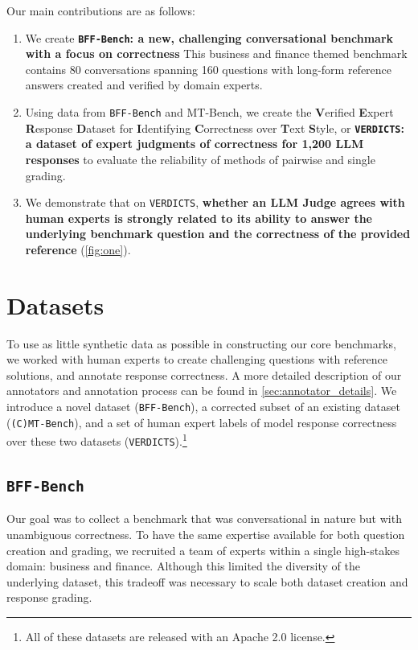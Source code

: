 \documentclass{article}
\newcommand{\judgebenchmark}{\texttt{VERDICTS}}
\newcommand{\evalbenchmark}{\texttt{BFF-Bench}}
\newcommand{\cevalbenchmark}{\texttt{(C)MT-Bench}}
\begin{document}
Our main contributions are as follows:
\begin{enumerate}
\item We create {\bf \evalbenchmark{}: a new, challenging conversational benchmark with a focus on correctness } This business and finance themed benchmark contains 80 conversations spanning 160 questions with long-form reference answers created and verified by domain experts.
\item Using data from \evalbenchmark{} and MT-Bench, we create the \textbf{V}erified \textbf{E}xpert \textbf{R}esponse \textbf{D}ataset for \textbf{I}dentifying \textbf{C}orrectness over \textbf{T}ext \textbf{S}tyle, or {\bf \judgebenchmark{}: a dataset of expert judgments of correctness for 1,200 LLM responses} to evaluate the reliability of methods of pairwise and single grading.
\item We demonstrate that on \judgebenchmark{}, {\bf whether an LLM Judge agrees with human experts is strongly related to its ability to answer the underlying benchmark question and the correctness of the provided reference} (\cref{fig:one}).
\end{enumerate}




\section{Datasets}
\label{sec:datasets}

To use as little synthetic data as possible in constructing our core benchmarks, we worked with human experts to create challenging questions with reference solutions, and annotate response correctness. A more detailed description of our annotators and annotation process can be found in \cref{sec:annotator_details}. We introduce a novel dataset (\evalbenchmark{}), a corrected subset of an existing dataset (\cevalbenchmark{}), and a set of human expert labels of model response correctness over these two datasets (\judgebenchmark{}).\footnote{All of these datasets are released with an Apache 2.0 license.}


\subsection{\evalbenchmark{}}

Our goal was to collect a benchmark that was conversational in nature but with unambiguous correctness. To have the same expertise available for both question creation and grading, we recruited a team of experts within a single high-stakes domain: business and finance. Although this limited the diversity of the underlying dataset, this tradeoff was necessary to scale both dataset creation and response grading.
\end{document}
